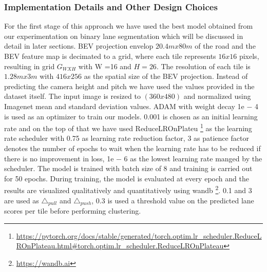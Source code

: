         \subsubsection{Implementation Details and Other Design Choices }
        For the first stage of this approach we have used the best model obtained from our experimentation on binary lane segmentation which will be discussed in detail in later sections. BEV projection envelop $20.4m x 80m$ of the road and the BEV feature map is decimated to a grid, where each tile represents $16x16$ pixels, resulting in grid $G_{WXH}$ with W =16 and $H =26$. The resolution of each tile is $1.28m x 3m$ with $416x256$ as the spatial size of the BEV projection. Instead of predicting the camera height and pitch we have used the values provided in the dataset itself.  The input image is
        resized to $(360x480)$ and normalized using Imagenet\cite{deng2009imagenet} mean and standard deviation values. ADAM with weight decay 1e − 4 is used as an optimizer to train our models. 0.001 is chosen as an initial learning rate and on the top of that we have used ReduceLROnPlateu \footnote{\url{https://pytorch.org/docs/stable/generated/torch.optim.lr_scheduler.ReduceLROnPlateau.html#torch.optim.lr_scheduler.ReduceLROnPlateau}} as the learning rate scheduler with 0.75 as learning rate reduction factor, 3 as patience factor denotes the number of epochs to wait when the learning rate has to be reduced if there is no improvement in loss, 1e − 6 as the lowest learning rate manged by the scheduler. The model is trained with batch size of 8 and training is carried out for 50 epochs. During training, the model is evaluated at every epoch and the results are visualized qualitatively and quantitatively using wandb \footnote{\url{https://wandb.ai}}. 0.1 and 3 are used as $\triangle_{pull}$ and $\triangle_{push}$, 0.3 is used a threshold value on the predicted lane scores per tile before performing clustering.
        

